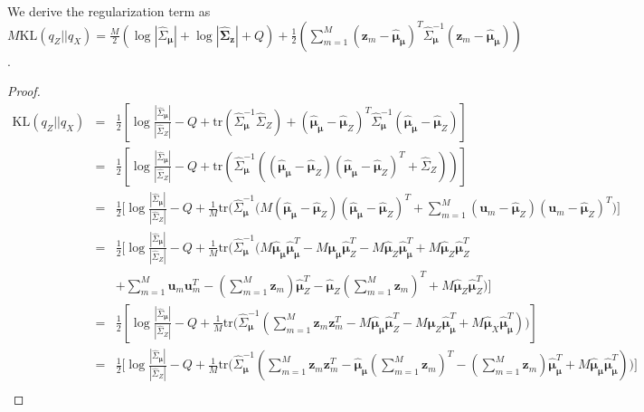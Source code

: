 \begin{lemma}
	We derive the regularization term as $M\mathrm{KL}(q_Z || q_X) = \frac{M}{2}(\log |\hat{\Sigma}_{\bm \mu}| + \log|\hat{\bm\Sigma}_{\bm z}| + Q) + \frac{1}{2}\left(\sum_{m = 1}^M(\bm z_m - \hat{\bm \mu}_{\bm \mu})^T\hat{\Sigma}_{\bm\mu}^{-1}(\bm z_m - \hat{\bm \mu}_{\bm \mu})\right)$.
\end{lemma}

\begin{proof}
	{\footnotesize
		\begin{eqnarray}
		\mathrm{KL}(q_Z || q_X) & = & \frac{1}{2}\left[\log\frac{|\hat{\Sigma}_{\bm\mu}|}{|\hat{\Sigma}_Z|} - Q + \mathrm{tr}(\hat{\Sigma}_{\bm\mu}^{-1}\hat{\Sigma}_Z)+(\hat{\bm \mu}_{\bm\mu} - \hat{\bm \mu}_Z)^T\hat{\Sigma}_{\bm\mu}^{-1}(\hat{\bm \mu}_{\bm\mu} - \hat{\bm \mu}_Z)\right] \nonumber \\
		& = & \frac{1}{2}\left[\log\frac{|\hat{\Sigma}_{\bm\mu}|}{|\hat{\Sigma}_Z|} - Q + \mathrm{tr}\left(\hat{\Sigma}_{\bm\mu}^{-1}((\hat{\bm \mu}_{\bm\mu} - \hat{\bm \mu}_Z)(\hat{\bm \mu}_{\bm\mu} - \hat{\bm \mu}_Z)^T + \hat{\Sigma}_Z)\right)\right] \nonumber \\
		& = & \frac{1}{2}\Bigg[\log\frac{|\hat{\Sigma}_{\bm\mu}|}{|\hat{\Sigma}_Z|} - Q + \frac{1}{M}\mathrm{tr}\bigg(\hat{\Sigma}_{\bm\mu}^{-1}(M(\hat{\bm \mu}_{\bm\mu} - \hat{\bm \mu}_Z)(\hat{\bm \mu}_{\bm\mu} - \hat{\bm \mu}_Z)^T + \sum_{m = 1}^{M}(\bm u_m - \hat{\bm \mu}_Z)(\bm u_m - \hat{\bm \mu}_Z)^T\bigg)\Bigg] \nonumber \\
		& = & \frac{1}{2}\Bigg[\log\frac{|\hat{\Sigma}_{\bm\mu}|}{|\hat{\Sigma}_Z|} - Q + \frac{1}{M}\mathrm{tr}\bigg(\hat{\Sigma}_{\bm\mu}^{-1}(M\hat{\bm \mu}_{\bm\mu}\hat{\bm \mu}_{\bm\mu}^T - M\hat{\bm \mu}_{\bm\mu}\hat{\bm \mu}_Z^T - M\hat{\bm \mu}_Z\hat{\bm \mu}_{\bm\mu}^T + M\hat{\bm \mu}_Z\hat{\bm \mu}_Z^T \nonumber \\ 
		& & + \sum_{m = 1}^{M}\bm u_m \bm u_m^T - (\sum_{m = 1}^{M}\bm z_m)\hat{\bm \mu}_Z^T - \hat{\bm \mu}_Z(\sum_{m = 1}^{M}\bm z_m)^T + M\hat{\bm \mu}_Z\hat{\bm \mu}_Z^T \bigg)\Bigg] \nonumber \\
		& = &  \frac{1}{2}\left[\log\frac{|\hat{\Sigma}_{\bm\mu}|}{|\hat{\Sigma}_Z|} - Q + \frac{1}{M}\mathrm{tr}\bigg(\hat{\Sigma}_{\bm\mu}^{-1}(\sum_{m = 1}^{M}\bm z_m\bm z_m^T - M\hat{\bm \mu}_{\bm\mu}\hat{\bm \mu}_Z^T - M\hat{\bm \mu}_Z\hat{\bm \mu}_{\bm\mu}^T + M\hat{\bm \mu}_X\hat{\bm \mu}_{\bm\mu}^T)\bigg)\right]\nonumber \\
		& = &  \frac{1}{2}\Bigg[\log\frac{|\hat{\Sigma}_{\bm\mu}|}{|\hat{\Sigma}_Z|} - Q + \frac{1}{M}\mathrm{tr}\bigg(\hat{\Sigma}_{\bm\mu}^{-1}(\sum_{m = 1}^{M}\bm z_m\bm z_m^T - \hat{\bm \mu}_{\bm\mu}(\sum_{m = 1}^{M}\bm z_m)^T - (\sum_{m = 1}^{M}\bm z_m)\hat{\bm \mu}_{\bm\mu}^T + M\hat{\bm \mu}_{\bm\mu}\hat{\bm \mu}_{\bm\mu}^T)\bigg)\Bigg]\nonumber \\

\end{eqnarray}}
\end{proof}
